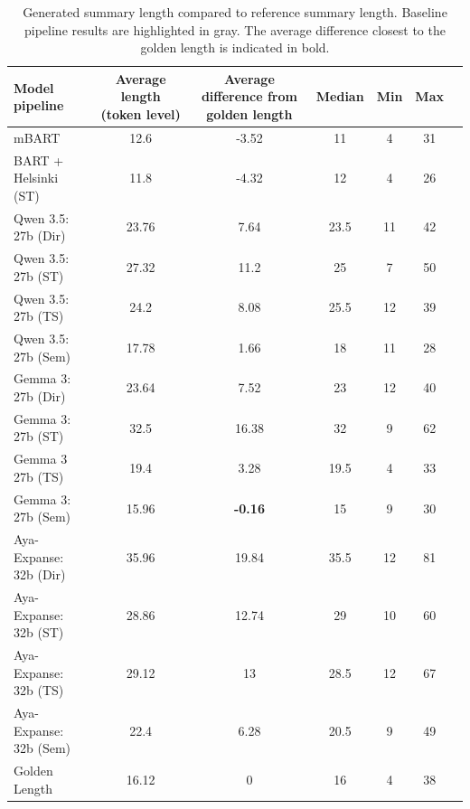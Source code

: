 \documentclass[11pt]{article}
\begin{document}
\begin{table}[ht]
\centering
\small
\begin{tabular}{lcccccc}
\hline
\textbf{Model pipeline} & \textbf{Average length (token level)} & \textbf{Average difference from golden length} & \textbf{Median} & \textbf{Min} & \textbf{Max}\\ \hline

\rowcolor{gray!15}mBART                             & 12.6  & -3.52            & 11   & 4  & 31 \\
\rowcolor{gray!15}BART + Helsinki (ST)              & 11.8  & -4.32            & 12   & 4  & 26 \\ \hline
Qwen 3.5: 27b (Dir)               & 23.76 & 7.64             & 23.5 & 11 & 42 \\
Qwen 3.5: 27b (ST)                & 27.32 & 11.2            & 25   & 7  & 50 \\
Qwen 3.5: 27b (TS)                & 24.2  & 8.08             & 25.5 & 12 & 39 \\
Qwen 3.5: 27b (Sem)               & 17.78 & 1.66             & 18   & 11 & 28 \\ \hline
Gemma 3: 27b (Dir)                & 23.64 & 7.52             & 23   & 12 & 40 \\
Gemma 3: 27b (ST)                 & 32.5  & 16.38           & 32   & 9  & 62 \\
Gemma 3 27b (TS)                  & 19.4  & 3.28             & 19.5 & 4  & 33 \\
Gemma 3: 27b (Sem)                & 15.96 & \textbf{-0.16}   & 15   & 9  & 30 \\ \hline
Aya-Expanse: 32b (Dir)            & 35.96 & 19.84           & 35.5 & 12 & 81 \\
Aya-Expanse: 32b (ST)             & 28.86 & 12.74           & 29   & 10 & 60 \\
Aya-Expanse: 32b (TS)             & 29.12 & 13              & 28.5 & 12 & 67 \\
Aya-Expanse: 32b (Sem)            & 22.4  & 6.28             & 20.5 & 9  & 49 \\ \hline
\rowcolor{yellow!15}Golden Length & 16.12 & 0               & 16   & 4  & 38 \\
\hline
\end{tabular}
\caption{Generated summary length compared to reference summary length. Baseline pipeline results are highlighted in gray. The average difference closest to the golden length is indicated in bold.}
\label{tab:generated_vs_reference_length}
\end{table}
\end{document}
